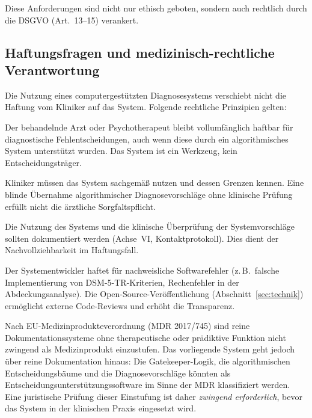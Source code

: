 \documentclass[11pt,a4paper]{article}
\begin{document}
Diese Anforderungen sind nicht nur ethisch geboten, sondern auch rechtlich durch die DSGVO (Art.~13--15) verankert.

\subsection{Haftungsfragen und medizinisch-rechtliche Verantwortung}

Die Nutzung eines computergest\"utzten Diagnosesystems verschiebt nicht die Haftung vom Kliniker auf das System. Folgende rechtliche Prinzipien gelten:

\begin{description}[style=nextline, leftmargin=1.5cm, font=\bfseries]
\item[Behandler-Haftung bleibt bestehen] Der behandelnde Arzt oder Psychotherapeut bleibt vollumf\"anglich haftbar f\"ur diagnostische Fehlentscheidungen, auch wenn diese durch ein algorithmisches System unterst\"utzt wurden. Das System ist ein Werkzeug, kein Entscheidungstr\"ager.
\item[Sorgfaltspflicht bei Systemnutzung] Kliniker m\"ussen das System sachgem\"a\ss{} nutzen und dessen Grenzen kennen. Eine blinde \"Ubernahme algorithmischer Diagnosevorschl\"age ohne klinische Pr\"ufung erf\"ullt nicht die \"arztliche Sorgfaltspflicht.
\item[Dokumentationspflicht] Die Nutzung des Systems und die klinische \"Uberpr\"ufung der Systemvorschl\"age sollten dokumentiert werden (Achse~VI, Kontaktprotokoll). Dies dient der Nachvollziehbarkeit im Haftungsfall.
\item[Produkthaftung des Entwicklers] Der Systementwickler haftet f\"ur nachweisliche Softwarefehler (z.\,B.\ falsche Implementierung von DSM-5-TR-Kriterien, Rechenfehler in der Abdeckungsanalyse). Die Open-Source-Ver\"offentlichung (Abschnitt~\ref{sec:technik}) erm\"oglicht externe Code-Reviews und erh\"oht die Transparenz.
\item[Medizinprodukt-Einstufung bedarf juristischer Kl\"arung] Nach EU-Medizinprodukteverordnung (MDR 2017/745) sind reine Dokumentationssysteme ohne therapeutische oder pr\"adiktive Funktion nicht zwingend als Medizinprodukt einzustufen. Das vorliegende System geht jedoch \"uber reine Dokumentation hinaus: Die Gatekeeper-Logik, die algorithmischen Entscheidungsb\"aume und die Diagnosevorschl\"age k\"onnten als Entscheidungsunterst\"utzungssoftware im Sinne der MDR klassifiziert werden. Eine juristische Pr\"ufung dieser Einstufung ist daher \textit{zwingend erforderlich}, bevor das System in der klinischen Praxis eingesetzt wird.
\end{description}
\end{document}
